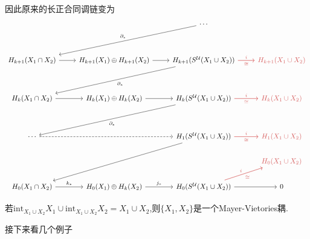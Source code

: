 \documentclass{article}
\begin{document}
因此原来的长正合同调链变为
\[\begin{tikzcd}
	&& \cdots \\
	\\
	{H_{k+1}(X_1\cap X_2)} & {H_{k+1}(X_1)\oplus H_{k+1}(X_2)} & {H_{k+1}(S^\mathcal{U}(X_1\cup X_2))} & \textcolor{rgb,255:red,214;green,92;blue,92}{H_{k+1}(X_1\cup X_2)} \\
	\\
	{H_{k}(X_1\cap X_2)} & {H_{k}(X_1)\oplus H_k(X_2)} & {H_k(S^\mathcal{U}(X_1\cup X_2))} & \textcolor{rgb,255:red,214;green,92;blue,92}{H_k(X_1\cup X_2)} \\
	\\
	\cdots && {H_1(S^\mathcal{U}(X_1\cup X_2))} & \textcolor{rgb,255:red,214;green,92;blue,92}{H_1(X_1\cup X_2)} \\
	&&& \textcolor{rgb,255:red,214;green,92;blue,92}{H_0(X_1\cup X_2)} \\
	{H_0(X_1\cap X_2)} & {H_{0}(X_1)\oplus H_k(X_2)} & {H_0(S^\mathcal{U}(X_1\cup X_2))} & 0
	\arrow["{\partial_*}", from=3-3, to=5-1]
	\arrow[from=3-1, to=3-2]
	\arrow[from=3-2, to=3-3]
	\arrow[from=5-1, to=5-2]
	\arrow[from=5-2, to=5-3]
	\arrow["{\partial_*}"', from=1-3, to=3-1]
	\arrow["{\partial_*}", from=5-3, to=7-1]
	\arrow[dashed, from=7-1, to=7-3]
	\arrow[from=7-3, to=9-1]
	\arrow["{k_*}", from=9-1, to=9-2]
	\arrow["{j_*}", from=9-2, to=9-3]
	\arrow["i", color={rgb,255:red,214;green,92;blue,92}, from=3-3, to=3-4]
	\arrow["\cong"', color={rgb,255:red,214;green,92;blue,92}, from=3-3, to=3-4]
	\arrow["\cong"', color={rgb,255:red,214;green,92;blue,92}, from=5-3, to=5-4]
	\arrow["i", color={rgb,255:red,214;green,92;blue,92}, from=5-3, to=5-4]
	\arrow["i", color={rgb,255:red,214;green,92;blue,92}, from=7-3, to=7-4]
	\arrow["\cong"', color={rgb,255:red,214;green,92;blue,92}, from=7-3, to=7-4]
	\arrow["i", color={rgb,255:red,214;green,92;blue,92}, from=9-3, to=8-4]
	\arrow["\cong"', color={rgb,255:red,214;green,92;blue,92}, from=9-3, to=8-4]
	\arrow[from=9-3, to=9-4]
\end{tikzcd}\]
\begin{example}
    若$\text{int}_{X_1\cup X_2} X_1 \cup \text{int}_{X_1\cup X_2} X_2 = X_1\cup X_2$,则$\{X_1,X_2\}$是一个Mayer-Vietories耦.
\end{example}
接下来看几个例子
\end{document}
